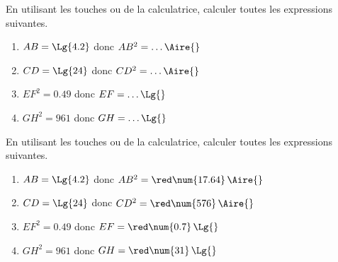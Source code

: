 \begin{exercice*}
    \reademptyitems
    En utilisant les touches  ou \Calculatrice{//$\sqrt{\phantom{rrr}}$} de la calculatrice, calculer toutes les expressions suivantes.    
    \begin{enumerate}
        \item $AB=\Lg{4.2}$ donc $AB^2=\ldots\Aire{}$
        \item $CD=\Lg{24}$ donc $CD^2=\ldots\Aire{}$
        \item $EF^2=\num{0.49}$ donc $EF=\ldots\Lg{}$
        \item $GH^2=961$ donc $GH=\ldots\Lg{}$
    \end{enumerate}    
\end{exercice*}
\begin{corrige}
    \reademptyitems
    En utilisant les touches  ou \Calculatrice{//$\sqrt{\phantom{rrr}}$} de la calculatrice, calculer toutes les expressions suivantes.
    
    \begin{enumerate}
        \item $AB=\Lg{4.2}$ donc $AB^2={\red \num{17.64}}\,\Aire{}$
        \item $CD=\Lg{24}$ donc $CD^2={\red\num{576}}\,\Aire{}$
        \item $EF^2=\num{0.49}$ donc $EF={\red\num{0.7}}\,\Lg{}$
        \item $GH^2=961$ donc $GH={\red\num{31}}\,\Lg{}$
    \end{enumerate}  
\end{corrige}

